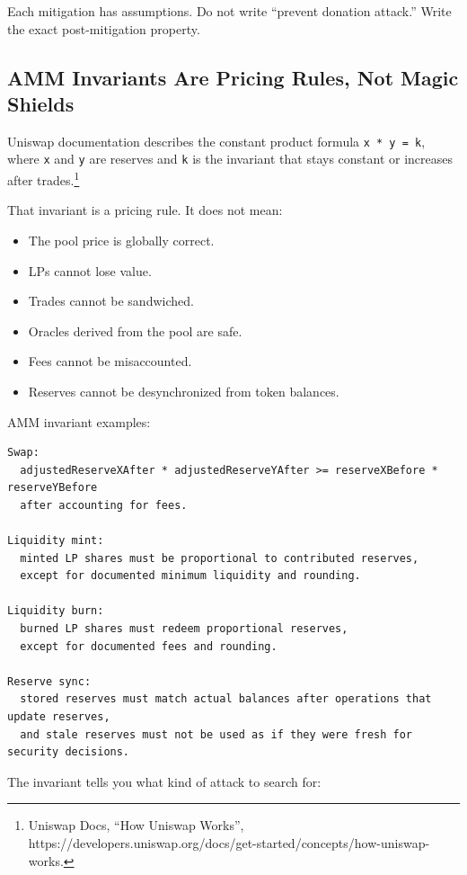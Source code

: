 Each mitigation has assumptions. Do not write ``prevent donation
attack.'' Write the exact post-mitigation property.

\subsection{AMM Invariants Are Pricing Rules, Not Magic Shields}

Uniswap documentation describes the constant product formula
\passthrough{\lstinline!x * y = k!}, where \passthrough{\lstinline!x!}
and \passthrough{\lstinline!y!} are reserves and
\passthrough{\lstinline!k!} is the invariant that stays constant or
increases after trades.\footnote{Uniswap Docs, ``How Uniswap Works'',
  https://developers.uniswap.org/docs/get-started/concepts/how-uniswap-works.}

That invariant is a pricing rule. It does not mean:

\begin{itemize}
\tightlist
\item
  The pool price is globally correct.
\item
  LPs cannot lose value.
\item
  Trades cannot be sandwiched.
\item
  Oracles derived from the pool are safe.
\item
  Fees cannot be misaccounted.
\item
  Reserves cannot be desynchronized from token balances.
\end{itemize}

AMM invariant examples:

\begin{lstlisting}
Swap:
  adjustedReserveXAfter * adjustedReserveYAfter >= reserveXBefore * reserveYBefore
  after accounting for fees.

Liquidity mint:
  minted LP shares must be proportional to contributed reserves,
  except for documented minimum liquidity and rounding.

Liquidity burn:
  burned LP shares must redeem proportional reserves,
  except for documented fees and rounding.

Reserve sync:
  stored reserves must match actual balances after operations that update reserves,
  and stale reserves must not be used as if they were fresh for security decisions.
\end{lstlisting}

The invariant tells you what kind of attack to search for:

